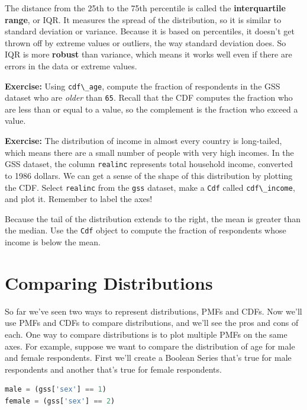 The distance from the 25th to the 75th percentile is called the
\textbf{interquartile range}, or IQR. It measures the spread of the
distribution, so it is similar to standard deviation or variance.
Because it is based on percentiles, it doesn't get thrown off by extreme
values or outliers, the way standard deviation does. So IQR is more
\textbf{robust} than variance, which means it works well even if there
are errors in the data or extreme values.

\textbf{Exercise:} Using \passthrough{\lstinline!cdf\_age!}, compute the
fraction of respondents in the GSS dataset who are \emph{older} than
\passthrough{\lstinline!65!}. Recall that the CDF computes the fraction
who are less than or equal to a value, so the complement is the fraction
who exceed a value.

\textbf{Exercise:} The distribution of income in almost every country is
long-tailed, which means there are a small number of people with very
high incomes. In the GSS dataset, the column
\passthrough{\lstinline!realinc!} represents total household income,
converted to 1986 dollars. We can get a sense of the shape of this
distribution by plotting the CDF. Select
\passthrough{\lstinline!realinc!} from the \passthrough{\lstinline!gss!}
dataset, make a \passthrough{\lstinline!Cdf!} called
\passthrough{\lstinline!cdf\_income!}, and plot it. Remember to label
the axes!

Because the tail of the distribution extends to the right, the mean is
greater than the median. Use the \passthrough{\lstinline!Cdf!} object to
compute the fraction of respondents whose income is below the mean.

\hypertarget{comparing-distributions}{%
\section{Comparing Distributions}\label{comparing-distributions}}

So far we've seen two ways to represent distributions, PMFs and CDFs.
Now we'll use PMFs and CDFs to compare distributions, and we'll see the
pros and cons of each. One way to compare distributions is to plot
multiple PMFs on the same axes. For example, suppose we want to compare
the distribution of age for male and female respondents. First we'll
create a Boolean Series that's true for male respondents and another
that's true for female respondents.

\begin{lstlisting}[language=Python,style=source]
male = (gss['sex'] == 1)
female = (gss['sex'] == 2)
\end{lstlisting}

